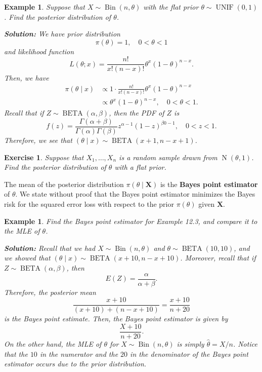 \documentclass[10pt]{article}
\DeclareMathOperator{\Bin}{Bin}
\DeclareMathOperator{\UNIF}{UNIF}
\DeclareMathOperator{\Nor}{N}
\DeclareMathOperator{\BETA}{BETA}
\theoremstyle{newstyle}
\newtheorem{exercise}[thm]{Exercise}
\newtheorem{exmp}[thm]{Example}
\begin{document}
\begin{exmp}
Suppose that $X \sim \Bin(n, \theta)$ with the flat prior $\theta \sim \UNIF(0, 1)$. Find the 
posterior distribution of $\theta$. 

{\color{blue}
{\bf Solution:}
We have prior distribution 
\[ \pi(\theta) = 1, \quad 0 < \theta < 1 \]
and likelihood function 
\[ L(\theta; x) = \frac{n!}{x!(n-x)!} \theta^x (1-\theta)^{n-x}. \]
Then, we have 
\begin{align*}
    \pi(\theta \mid x) &\propto 1 \cdot \frac{n!}{x!(n-x)!} \theta^x (1-\theta)^{n-x} \\
    &\propto \theta^x (1-\theta)^{n-x}, \quad 0 < \theta < 1. 
\end{align*} 
Recall that if $Z \sim \BETA(\alpha, \beta)$, then the PDF of $Z$ is 
\[ f(z) = \frac{\Gamma(\alpha + \beta)}{\Gamma(\alpha)\Gamma(\beta)} z^{\alpha-1}(1-z)^{\beta0-1}, 
\quad 0 < z < 1. \]
Therefore, we see that $(\theta \mid x) \sim \BETA(x+1, n-x+1)$.}
\end{exmp}

\begin{exercise}
Suppose that $X_1, \dots, X_n$ is a random sample drawn from $\Nor(\theta, 1)$. Find the 
posterior distribution of $\theta$ with a flat prior. 
\end{exercise}

The mean of the posterior distribution $\pi(\theta \mid \mathbf X)$ is the {\bf Bayes point 
estimator} of $\theta$. We state without proof that the Bayes point estimator minimizes the 
Bayes risk for the squared error loss with respect to the prior $\pi(\theta)$ given $\mathbf X$. 

\begin{exmp}
Find the Bayes point estimator for Example 12.3, and compare it to the MLE of $\theta$. 

{\color{blue}
{\bf Solution:}
Recall that we had $X \sim \Bin(n, \theta)$ and $\theta \sim \BETA(10, 10)$, and we showed that 
$(\theta \mid x) \sim \BETA(x+10, n-x+10)$. Moreover, recall that if $Z \sim \BETA(\alpha, \beta)$, then 
\[ E(Z) = \frac{\alpha}{\alpha+\beta}. \]
Therefore, the posterior mean 
\[ \frac{x+10}{(x+10) + (n-x+10)} = \frac{x+10}{n+20} \]
is the Bayes point estimate. Then, the Bayes point estimator is given by 
\[ \frac{X+10}{n+20}. \]
On the other hand, the MLE of $\theta$ for $X \sim \Bin(n, \theta)$ is simply 
$\hat\theta = X/n$. Notice that the $10$ in the numerator and the $20$ in the denominator 
of the Bayes point estimator occurs due to the prior distribution.}
\end{exmp}
\end{document}
